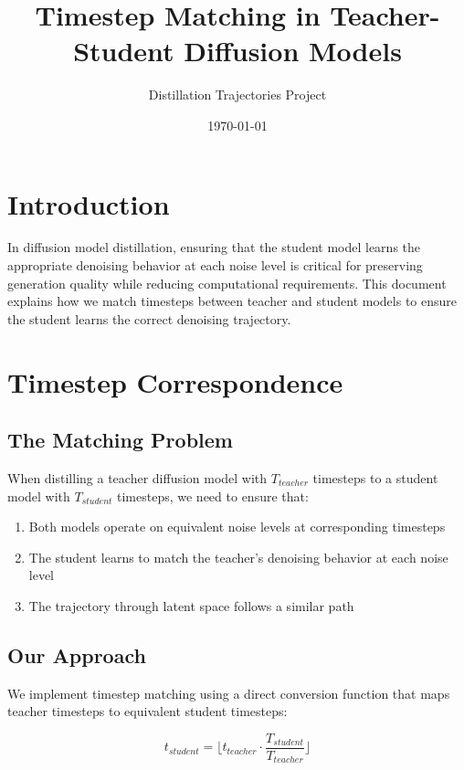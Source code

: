 \documentclass{article}
\title{Timestep Matching in Teacher-Student Diffusion Models}
\author{Distillation Trajectories Project}
\date{\today}
\begin{document}
\maketitle

\section{Introduction}

In diffusion model distillation, ensuring that the student model learns the appropriate denoising behavior at each noise level is critical for preserving generation quality while reducing computational requirements. This document explains how we match timesteps between teacher and student models to ensure the student learns the correct denoising trajectory.

\section{Timestep Correspondence}

\subsection{The Matching Problem}

When distilling a teacher diffusion model with $T_{teacher}$ timesteps to a student model with $T_{student}$ timesteps, we need to ensure that:

\begin{enumerate}
  \item Both models operate on equivalent noise levels at corresponding timesteps
  \item The student learns to match the teacher's denoising behavior at each noise level
  \item The trajectory through latent space follows a similar path
\end{enumerate}

\subsection{Our Approach}

We implement timestep matching using a direct conversion function that maps teacher timesteps to equivalent student timesteps:

\begin{equation}
t_{student} = \lfloor t_{teacher} \cdot \frac{T_{student}}{T_{teacher}} \rfloor
\end{equation}
\end{document}
